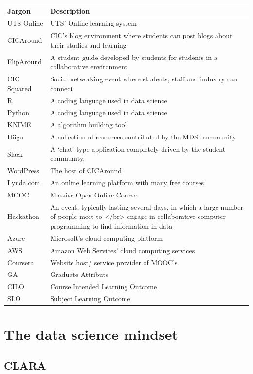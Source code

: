 \documentclass[]{book}
\theoremstyle{definition}
\theoremstyle{definition}
\theoremstyle{remark}
\begin{document}
\begin{tabular}{l|l}
\hline
Jargon & Description\\
\hline
UTS Online & UTS’ Online learning system\\
\hline
CICAround & CIC’s blog environment where students can post blogs about their studies and learning\\
\hline
FlipAround & A student guide developed by students for students in a collaborative environment\\
\hline
CIC Squared & Social networking event where students, staff and industry can connect\\
\hline
R & A coding language used in data science\\
\hline
Python & A coding language used in data science\\
\hline
KNIME & A algorithm building tool\\
\hline
Diigo & A collection of resources contributed by the MDSI community\\
\hline
Slack & A ‘chat’ type application completely driven by the student community.\\
\hline
WordPress & The host of CICAround\\
\hline
Lynda.com & An online learning platform with many free courses\\
\hline
MOOC & Massive Open Online Course\\
\hline
Hackathon & An event, typically lasting several days, in which a large number of people meet to </br> engage in collaborative computer programming to find information in data\\
\hline
Azure & Microsoft’s cloud computing platform\\
\hline
AWS & Amazon Web Services’ cloud computing services\\
\hline
Coursera & Website host/ service provider of MOOC’s\\
\hline
GA & Graduate Attribute\\
\hline
CILO & Course Intended Learning Outcome\\
\hline
SLO & Subject Learning Outcome\\
\hline
\end{tabular}

\chapter{The data science mindset}\label{the-data-science-mindset}

\section{CLARA}\label{clara}
\end{document}
